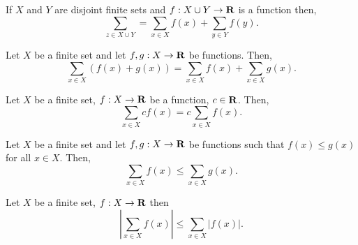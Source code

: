 \begin{lem}\label{c6s1l11}
If $X$ and $Y$ are disjoint finite sets and $f: X \cup Y \rightarrow \mathbf{R}$
is a function then,
\[
\sum_{z \in X \cup Y} = \sum_{x \in X}f(x) + \sum_{y \in Y}f(y).
\]
\end{lem}

\begin{lem}\label{c6s1l12}
Let $X$ be a finite set and let $f, g: X \rightarrow \mathbf{R}$ be functions.
Then,
\[
\sum_{x \in X}(f(x) + g(x)) = \sum_{x \in X}f(x) + \sum_{x \in X}g(x).
\]
\end{lem}

\begin{lem}\label{c6s1l13}
Let $X$ be a finite set, $f: X \rightarrow \mathbf{R}$ be a function, $c \in \mathbf{R}$.
Then,
\[
\sum_{x \in X} cf(x) = c\sum_{x \in X}f(x).
\]
\end{lem}

\begin{lem}\label{c6s1l14}
Let $X$ be a finite set and let $f, g: X \rightarrow \mathbf{R}$ be functions
such that $f(x) \le g(x)$ for all $x \in X$. Then,
\[
\sum_{x \in X}f(x) \le \sum_{x \in X}g(x).
\]
\end{lem}

\begin{lem}\label{c6s1l15}
Let $X$ be a finite set, $f:X \rightarrow \mathbf{R}$ then
\[
\left|\sum_{x \in X}f(x)\right| \le \sum_{x \in X}|f(x)|.
\]
\end{lem}

